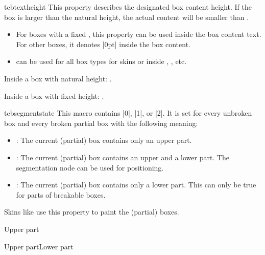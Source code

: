 \pagebreak
\begin{docCommand}[doc new=2016-02-16]{tcbtextheight}{}
  This property describes the designated box content height. If the
  box is larger than the natural height, the actual content will be smaller
  than .
  \begin{itemize}
  \item For boxes with a fixed , this property can
    be used inside the box content text. For other boxes, it denotes |0pt|
    inside the box content.
  \item {} can be used for all box types for skins or
    inside , , etc.
  \end{itemize}

\begin{dispExample}
\begin{tcolorbox}[enhanced,colframe=blue!75!black,
    underlay={\node[left,red] at (frame.east) {Here: \tcbtextheight};}]
  Inside a box with natural height: \tcbtextheight.
\end{tcolorbox}
\begin{tcolorbox}[enhanced,colframe=blue!75!black,height=1cm,
    underlay={\node[left,red] at (frame.east) {Here: \tcbtextheight};}]
  Inside a box with fixed height: \tcbtextheight.
\end{tcolorbox}
\end{dispExample}
\end{docCommand}


\begin{docCommand}[doc new=2017-04-25]{tcbsegmentstate}{}
  This macro contains |0|, |1|, or |2|. It is set for every unbroken box and every broken partial box
  with the following meaning:
  \begin{itemize}
    \item{}: The current (partial) box contains only an upper part.
    \item{}: The current (partial) box contains an upper and a lower part.
      The segmentation node can be used for positioning.
    \item{}: The current (partial) box contains only a lower part.
      This can only be true for parts of breakable boxes.
  \end{itemize}
  Skins like  use this property to paint the (partial) boxes.
\begin{dispExample}
\begin{tcbraster}[raster equal height,enhanced,
    watermark text=\tcbsegmentstate]
  \begin{tcolorbox}Upper part\end{tcolorbox}
  \begin{tcolorbox}Upper part\tcblower Lower part\end{tcolorbox}
\end{tcbraster}
\end{dispExample}
\end{docCommand}